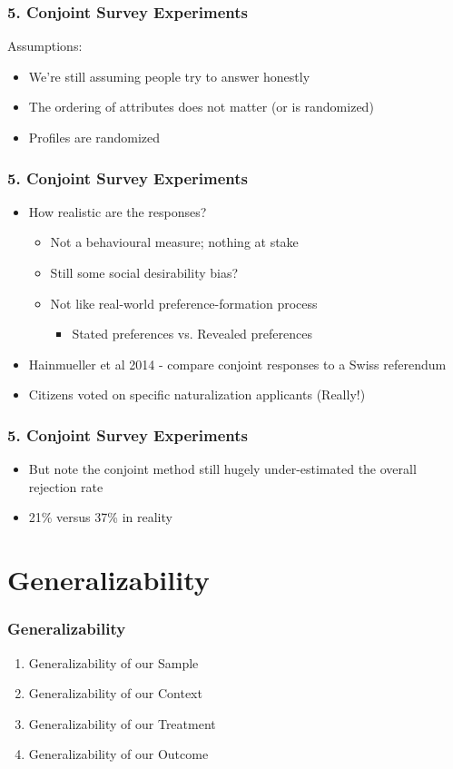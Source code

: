 \documentclass[xcolor=x11names,compress]{beamer}\usepackage[]{graphicx}\usepackage[]{color}
\renewcommand{\(}{\begin{columns}}
\renewcommand{\)}{\end{columns}}
\newcommand{\<}[1]{\begin{column}{#1}}
\renewcommand{\>}{\end{column}}
\begin{document}
\begin{frame}
\frametitle{5. Conjoint Survey Experiments}
Assumptions:
\begin{itemize}
\item We're still assuming people try to answer honestly
\pause
\item The ordering of attributes does not matter (or is randomized)
\pause
\item Profiles are randomized
\end{itemize}
\end{frame}

\begin{frame}
\frametitle{5. Conjoint Survey Experiments}
\begin{itemize}
\item How realistic are the responses?
\pause
\begin{itemize}
\item Not a behavioural measure; nothing at stake
\pause
\item Still some social desirability bias?
\pause
\item Not like real-world preference-formation process
\begin{itemize}
\item Stated preferences vs. Revealed preferences
\end{itemize}
\end{itemize}
\pause
\item Hainmueller et al 2014 - compare conjoint responses to a Swiss referendum
\pause
\item Citizens voted on specific naturalization applicants (Really!)
\end{itemize}
\end{frame}



\begin{frame}
\frametitle{5. Conjoint Survey Experiments}
\begin{itemize}
\item But note the conjoint method still hugely under-estimated the overall rejection rate
\item 21\% versus 37\% in reality
\end{itemize}
\end{frame}

\section{Generalizability}

\begin{frame}
\frametitle{Generalizability}
\begin{enumerate}
\item Generalizability of our Sample
\item Generalizability of our Context
\item Generalizability of our Treatment
\item Generalizability of our Outcome
\end{enumerate}
\end{frame}
\end{document}
